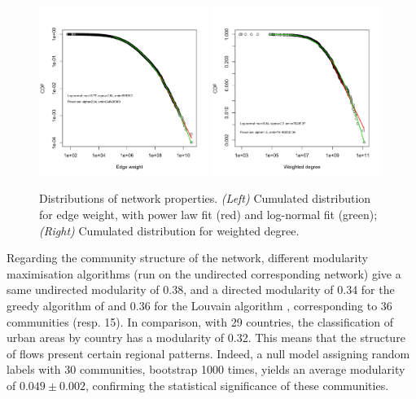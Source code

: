 \documentclass[11pt]{article}
\begin{document}
\begin{figure}
    \centering
    \includegraphics[width=0.49\textwidth]{figures/edgeweight.png}
    \includegraphics[width=0.49\textwidth]{figures/degreeDistr.png}
    \caption{Distributions of network properties. \textit{(Left)} Cumulated distribution for edge weight, with power law fit (red) and log-normal fit (green); \textit{(Right)} Cumulated distribution for weighted degree.}
    \label{fig:nwdist}
\end{figure}


Regarding the community structure of the network, different modularity maximisation algorithms (run on the undirected corresponding network) give a same undirected modularity of 0.38, and a directed modularity \cite{nicosia2009extending} of 0.34 for the greedy algorithm of \cite{clauset2004finding} and 0.36 for the Louvain algorithm \cite{blondel2008fast}, corresponding to 36 communities (resp. 15). In comparison, with 29 countries, the classification of urban areas by country has a modularity of 0.32. This means that the structure of flows present certain regional patterns. Indeed, a null model assigning random labels with 30 communities, bootstrap 1000 times, yields an average modularity of $0.049 \pm 0.002$, confirming the statistical significance of these communities.
\end{document}

